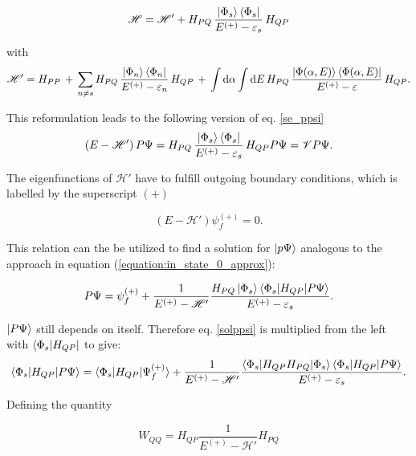 \begin{equation}
  \mathscr{H} = \mathscr{H}' + H_{PQ} \,\frac{\ket{\Phi_s}\bra{\Phi_s}}{E^{(+)}-\varepsilon_s}\, H_{QP}
\end{equation}

with
\begin{equation}
  \mathscr{H}' = H_{PP}\, + \,
  \sum\limits_{n\ne s} H_{PQ} \,\frac{\ket{\Phi_n}\bra{\Phi_n}}{E^{(+)}-\varepsilon_n}
  \, H_{QP} \,+\,
  \int \mathrm{d}\alpha \int\mathrm{d}E \,H_{PQ} \,
  \frac{\ket{\Phi(\alpha,E)}\bra{\Phi(\alpha,E)}}{E^{(+)}-\varepsilon} \, H_{QP} .
\end{equation}

This reformulation leads to the following version of eq. \ref{se_ppsi}
\begin{equation}
  (E - \mathscr{H}')\, P \Psi =
   H_{PQ} \,\frac{\ket{\Phi_s}\bra{\Phi_s}}{E^{(+)}-\varepsilon_s}\, H_{QP} P \Psi = \mathscr{V} P \Psi.
\end{equation}

The eigenfunctions of $\mathscr{H}'$ have to fulfill outgoing boundary conditions,
which is labelled by the superscript $(+)$

\begin{equation}
  (E-\mathscr{H}') \psi_f^{(+)} = 0 \label{sol_outg} .
\end{equation}

This relation can the be utilized to find a solution for $\ket{p \Psi}$ analogous
to the approach in equation (\ref{equation:in_state_0_approx}):

\begin{equation}\label{sol_ppsi}
  P \Psi = \psi_f^{(+)} + \frac{1}{E^{(+)} - \mathscr{H}'}
           \frac{H_{PQ}\ket{\Phi_s}
           \braket{\Phi_s|H_{QP}|P\Psi}}{E^{(+)} - \varepsilon_s} .
\end{equation}

$\ket{P \Psi}$ still depends on itself. Therefore 
eq. \ref{solppsi}
is multiplied from the left with $\bra{\Phi_s|H_{QP}}$ to give:
\begin{equation}
  \braket{\Phi_s|H_{QP}|P\Psi} = \braket{\Phi_s|H_{QP}|\Psi_f^{(+)}} +
  \frac{1}{E^{(+)} - \mathscr{H}'}
  \frac{\braket{\Phi_s|H_{QP}H_{PQ}|\Phi_s} \braket{\Phi_s|H_{QP}|P\Psi}}
       {E^{(+)} - \varepsilon_s}  \label{s_ppsi} .
\end {equation}

Defining the quantity

\begin{equation}
  W_{QQ} = H_{QP}\frac{1}{E^{(+)} - \mathscr{H}'}H_{PQ}
\end{equation}


